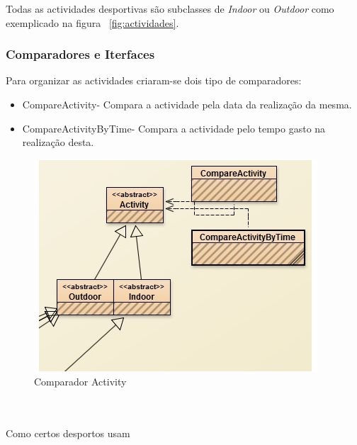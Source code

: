 \documentclass[10pt,notitlepage]{article}
\begin{document}
Todas as actividades desportivas são subclasses de \textit{Indoor} ou \textit{Outdoor} como exemplicado na figura ~\ref{fig:actividades}.
 
\subsubsection{Comparadores e Iterfaces}
Para organizar as actividades criaram-se dois tipo de comparadores:
\begin{itemize}
\item CompareActivity- Compara a actividade pela data da realização da mesma.
\item CompareActivityByTime- Compara a actividade pelo tempo gasto na realização desta.
\end{itemize}

\begin{figure}[ht]
\centering
\includegraphics[scale=1]{ComparadorActivity.png}
\caption{Comparador Activity}
\end{figure}

~\\~\\
Como certos desportos usam
\end{document}
